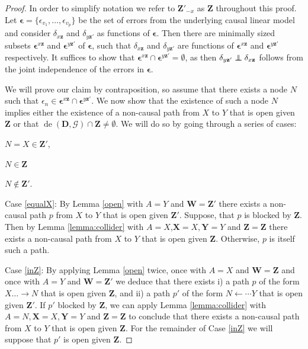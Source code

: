 \documentclass[11pt,a4paper]{article}
\theoremstyle{definition}
\theoremstyle{remark}
\newcommand\ci{\protect\mathpalette{\protect\independenT}{\perp}}
\def\independenT#1#2{\mathrel{\rlap{$#1#2$}\mkern2mu{#1#2}}}
\DeclareMathOperator{\de}{de}
\newcommand{\g}[1][G]{\mathcal{#1}}
\begin{document}
\begin{proof}
	In order to simplify notation we refer to $\mathbf{Z'}_{-x}$ as $\mathbf{Z}$ throughout this proof. Let $\boldsymbol{\epsilon}= \{\epsilon_{v_1},\dots, \epsilon_{v_p}\}$ be the set of errors from the underlying causal linear model and consider 
	$\delta_{x\mathbf{z}}$ and $\delta_{y\mathbf{z'}}$ as functions of $\boldsymbol{\epsilon}$. Then there are minimally sized subsets $\boldsymbol{\epsilon}^{x\mathbf{z}}$ and $\boldsymbol{\epsilon}^{y\mathbf{z'}}$ of $\boldsymbol{\epsilon}$, such that $\delta_{x\mathbf{z}}$ and $\delta_{y\mathbf{z'}}$ are functions of $\boldsymbol{\epsilon}^{x\mathbf{z}}$ and $\boldsymbol{\epsilon}^{y\mathbf{z'}}$ respectively. It suffices to show that $\boldsymbol{\epsilon}^{x\mathbf{z}} \cap \boldsymbol{\epsilon}^{y\mathbf{z'}} = \emptyset$, as then $\delta_{y\mathbf{z'}} \ci \delta_{x\mathbf{z}}$ follows from the joint independence of the errors in $\boldsymbol{\epsilon}$.
	
	We will prove our claim by contraposition, so assume that there exists a node $N$ such that $\epsilon_n \in \boldsymbol{\epsilon}^{x\mathbf{z}} \cap \boldsymbol{\epsilon}^{y\mathbf{z'}}$. We now show that the existence of such a node $N$ implies either the existence of a non-causal path from $X$ to $Y$ that is open given $\mathbf{Z}$ or that $\de(\mathbf{D},\g) \cap \mathbf{Z} \neq\emptyset$. We will do so by going through a series of cases:
	\begin{mylist}
		\item $N =X \in \mathbf{Z'}$, \label{equalX}
		\item $N \in \mathbf{Z}$ \label{inZ} 
		\item $N \notin \mathbf{Z'}$. \label{neither}
	\end{mylist}
	
	
	Case \ref{equalX}:  By Lemma \ref{open} with $A=Y$ and $\mathbf{W}=\mathbf{Z'}$ there exists a non-causal path $p$ from $X$ to $Y$ that is open given $\mathbf{Z'}$. Suppose, that $p$ is blocked by $\mathbf{Z}$. Then by Lemma \ref{lemma:collider} with $A=X$,$\mathbf{X}=X,\mathbf{Y}=Y$ and $\mathbf{Z}=\mathbf{Z}$ there exists a non-causal path from $X$ to $Y$ that is open given $\mathbf{Z}$. Otherwise, $p$ is itself such a path.
		
	
	Case \ref{inZ}: By applying Lemma \ref{open} twice, once with $A=X$ and $\mathbf{W}=\mathbf{Z}$ and once with $A=Y$ and $\mathbf{W}=\mathbf{Z'}$ we deduce that  there exists i) a path $p$ of the form $X \dots \rightarrow N$ that is open given $\mathbf{Z}$, and ii) a path $p'$ of the form $N \leftarrow \cdots Y$ that is open given $\mathbf{Z'}$. 
	If $p'$ blocked by $\mathbf{Z}$, we can apply Lemma \ref{lemma:collider} with $A=N, \mathbf{X}=X, \mathbf{Y}=Y$ and $\mathbf{Z}=\mathbf{Z}$ to conclude that there exists a non-causal path from $X$ to $Y$ that is open given $\mathbf{Z}$. For the remainder of Case \ref{inZ} we will suppose that $p'$ is open given $\mathbf{Z}$.
	

\end{proof}
\end{document}
